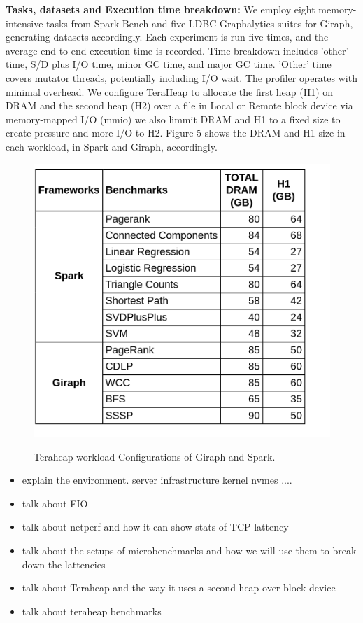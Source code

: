 \textbf{Tasks, datasets and Execution time breakdown:} We employ eight memory-intensive tasks from Spark-Bench and five LDBC Graphalytics suites for Giraph, generating datasets accordingly. Each experiment is run five times, and the average end-to-end execution time is recorded. Time breakdown includes 'other' time, S/D plus I/O time, minor GC time, and major GC time. 'Other' time covers mutator threads, potentially including I/O wait. The profiler operates with minimal overhead. We configure TeraHeap to allocate the first heap (H1) on DRAM and the second heap (H2) over a file in Local or Remote block device via memory-mapped I/O (mmio) we also limmit DRAM and H1 to a fixed size to create pressure and more I/O to H2. Figure 5 shows the DRAM and H1 size in each workload, in Spark and Giraph, accordingly.
\begin{figure}[h]
\includegraphics[scale=0.2]{figures/tera_task_conf.drawio.png}\\
\caption{Teraheap workload Configurations of Giraph and Spark.}
\end{figure}

\begin{itemize}
    \item explain the environment. server infrastructure kernel nvmes ....
    \item talk about FIO 
    \item talk about netperf and how it can show stats of TCP lattency
    \item talk about the setups of microbenchmarks and how we will use them to break down the lattencies
    \item talk about Teraheap and the way it uses a second heap over block device
    \item talk about teraheap benchmarks
\end{itemize}